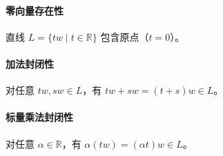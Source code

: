 \paragraph{零向量存在性}  
直线 \(L = \{tw \mid t \in \mathbb{R}\}\) 包含原点（\(t=0\)）。

\paragraph{加法封闭性}  
对任意 \(tw, sw \in L\)，有 \(tw + sw = (t+s)w \in L\)。

\paragraph{标量乘法封闭性}  
对任意 \(\alpha \in \mathbb{R}\)，有 \(\alpha(tw) = (\alpha t)w \in L\)。